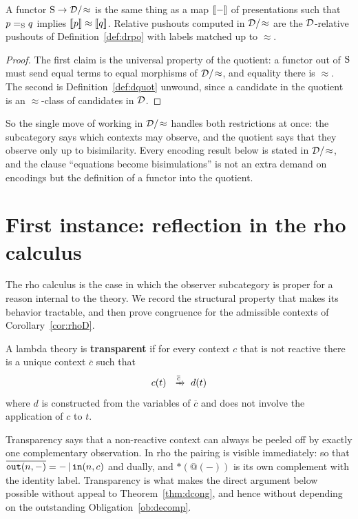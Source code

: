 \documentclass{article}
\begin{document}
\begin{proposition}
\label{prop:quot}
    A functor $\mathrm{S}\to \mathcal{D}/\!\approx$ is the same thing as a map $[\![-]\!]$ of presentations such that $p=_{\mathrm{S}} q$ implies $[\![p]\!]\approx[\![q]\!]$. Relative pushouts computed in $\mathcal{D}/\!\approx$ are the $\mathcal{D}$-relative pushouts of Definition~\ref{def:drpo} with labels matched up to $\approx$.
\end{proposition}
\begin{proof}
    The first claim is the universal property of the quotient: a functor out of $\mathrm{S}$ must send equal terms to equal morphisms of $\mathcal{D}/\!\approx$, and equality there is $\approx$. The second is Definition~\ref{def:dquot} unwound, since a candidate in the quotient is an $\approx$-class of candidates in $\mathcal{D}$.
\end{proof}

So the single move of working in $\mathcal{D}/\!\approx$ handles both restrictions at once: the subcategory says which contexts may observe, and the quotient says that they observe only up to bisimilarity. Every encoding result below is stated in $\mathcal{D}/\!\approx$, and the clause ``equations become bisimulations'' is not an extra demand on encodings but the definition of a functor into the quotient.
\section{First instance: reflection in the rho calculus}
\label{sec:rho}

The rho calculus is the case in which the observer subcategory is proper for a reason internal to the theory. We record the structural property that makes its behavior tractable, and then prove congruence for the admissible contexts of Corollary~\ref{cor:rhoD}.

\begin{definition}
    A lambda theory is \textbf{transparent} if for every context $c$ that is not reactive there is a unique context $\overline{c}$ such that
    \[c(t) \xr{\overline{c}} d(t)\]
    where $d$ is constructed from the variables of $\overline{c}$ and does not involve the application of $c$ to $t$.
\end{definition}

Transparency says that a non-reactive context can always be peeled off by exactly one complementary observation. In rho the pairing is visible immediately:
so that $\overline{\mathtt{out}(n,-)}=-\,|\,\mathtt{in}(n,c)$ and dually, and $\ast(@(-))$ is its own complement with the identity label. Transparency is what makes the direct argument below possible without appeal to Theorem~\ref{thm:dcong}, and hence without depending on the outstanding Obligation~\ref{ob:decomp}.
\end{document}
